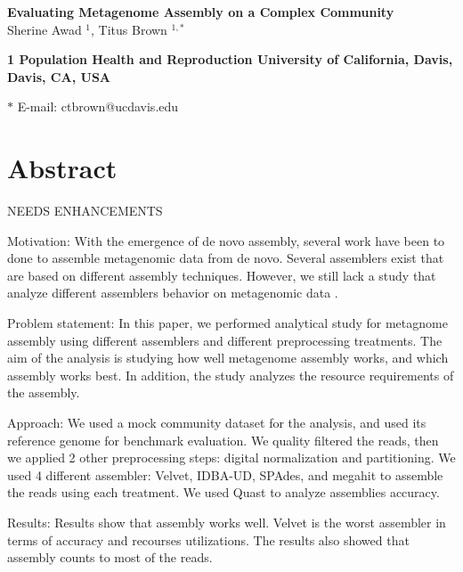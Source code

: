 \date{}

\pagestyle{myheadings}



 



\begin{flushleft}
{\Large
\textbf{Evaluating Metagenome Assembly on a Complex Community}
}
\\
 
Sherine Awad $^{1}$, 
Titus Brown $^{1,\ast}$ 

\bf{1} Population Health and Reproduction
University of California, Davis, Davis, CA, USA 
 
 
$\ast$ E-mail:  ctbrown@ucdavis.edu 
\end{flushleft}

\section*{Abstract}
NEEDS ENHANCEMENTS

Motivation: With the emergence of de novo assembly, several work have been to done to assemble metagenomic data from de novo. Several assemblers exist that are based on different assembly techniques. However, we still lack  a study that analyze different assemblers behavior on metagenomic data . 


Problem statement: In this paper, we performed analytical study for metagnome assembly using different assemblers and different preprocessing treatments. The aim of the analysis is studying how well metagenome assembly works, and which assembly works best. In addition, the study analyzes the resource requirements of the assembly. 


Approach: We used a mock community dataset for the analysis, and used its reference genome for benchmark evaluation. We quality filtered the reads, then we applied 2 other preprocessing steps: digital normalization and partitioning. We used 4 different assembler: Velvet, IDBA-UD, SPAdes, and megahit to assemble the reads using each treatment. We used Quast to analyze assemblies accuracy. 


Results: Results show that assembly works well. Velvet is the worst assembler in terms of accuracy and recourses utilizations. The results also showed that assembly counts to most of the reads. 
 
